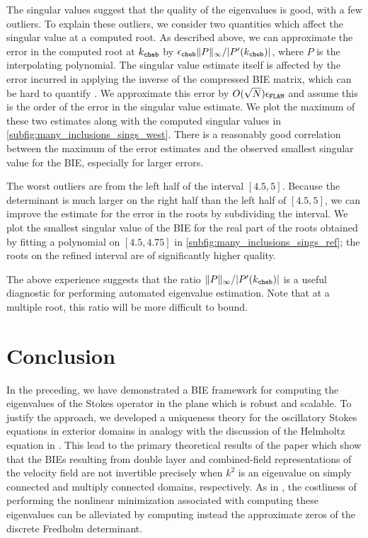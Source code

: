 The singular values suggest that the quality of the
eigenvalues is good, with a few outliers.
%
To explain these outliers, we consider two quantities
which affect the singular value at a computed root.
%
As described above, we can approximate the
error in the computed root at $k_{\texttt{cheb}}$ by
${\epsilon_{\texttt{cheb}}} \|P\|_\infty/|P'(k_{\texttt{cheb}})|$,
where $P$ is the interpolating polynomial.
%
The singular value estimate itself is affected by
the error incurred in applying the inverse of the
compressed BIE matrix, which can be hard to quantify
\cite{ho2012fast}.
%
We approximate this error by $O(\sqrt{N}){\epsilon_{\texttt{FLAM}}}$
and assume this is the order of the error in
the singular value estimate.
We plot the maximum of these two estimates
along with the computed singular values in
\cref{subfig:many_inclusions_sings_west}.
There is a reasonably good correlation between
the maximum of the error estimates and the
observed smallest singular value for the BIE,
especially for larger errors.

The worst outliers are from the left half
of the interval $[4.5,5]$.
%
Because the determinant is much larger on the
right half than the left half of $[4.5,5]$,
we can improve the estimate for the error
in the roots by subdividing the interval. 
We plot the smallest singular value of the
BIE for the {\color{red} real part of the}
roots obtained by fitting a polynomial
on $[4.5,4.75]$ in \cref{subfig:many_inclusions_sings_ref};
the roots on the refined interval
are of significantly higher quality.

\begin{remark}
  The above experience suggests that
  the ratio $\|P\|_\infty/|P'(k_{\texttt{cheb}})|$
  is a useful diagnostic for performing
  automated eigenvalue estimation.
  Note that at a multiple root, this ratio
  will be more difficult to bound.
\end{remark}
%



%


%
\section{Conclusion}
\label{sec:conclusion}

In the preceding, we have demonstrated a
BIE framework for computing the eigenvalues
of the Stokes operator in the plane which
is robust and scalable.
%
To justify the
approach, we developed a uniqueness theory
for the oscillatory Stokes equations in
exterior domains in analogy with the
discussion of the Helmholtz equation in
\cite{colton1983integral}.
%
This lead to the primary theoretical
results of the paper which show that the
BIEs resulting from double layer and
combined-field representations of the
velocity field are 
not invertible precisely when $k^2$ is
an eigenvalue on simply connected
and multiply connected domains, respectively.
%
As in \cite{zhao2015robust}, the costliness
of performing the nonlinear minimization
associated with computing these eigenvalues
can be alleviated by computing instead the
approximate zeros of the discrete Fredholm
determinant.

